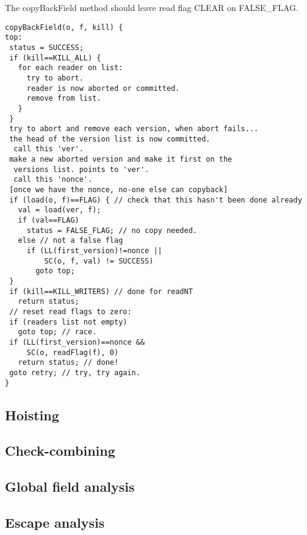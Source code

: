 \documentclass[preprint]{rdbacmconf}
\begin{document}
The copyBackField method should leave read flag CLEAR on FALSE\_FLAG.
\par {\footnotesize\samepage
\begin{verbatim}
copyBackField(o, f, kill) {
top:
 status = SUCCESS;
 if (kill==KILL_ALL) {
   for each reader on list:
     try to abort.
     reader is now aborted or committed.
     remove from list.
   }
 }
 try to abort and remove each version, when abort fails...
 the head of the version list is now committed.
  call this 'ver'.
 make a new aborted version and make it first on the
  versions list. points to 'ver'.
  call this 'nonce'.
 [once we have the nonce, no-one else can copyback]
 if (load(o, f)==FLAG) { // check that this hasn't been done already
   val = load(ver, f);
   if (val==FLAG)
     status = FALSE_FLAG; // no copy needed.
   else // not a false flag
     if (LL(first_version)!=nonce ||
         SC(o, f, val) != SUCCESS)
       goto top;
 }
 if (kill==KILL_WRITERS) // done for readNT
   return status;
 // reset read flags to zero:
 if (readers list not empty)
   goto top; // race.
 if (LL(first_version)==nonce &&
     SC(o, readFlag(f), 0)
   return status; // done!
 goto retry; // try, try again.
}
\end{verbatim}
}


\subsection{Hoisting}
\subsection{Check-combining}
\subsection{Global field analysis}
\subsection{Escape analysis}


\end{document}
